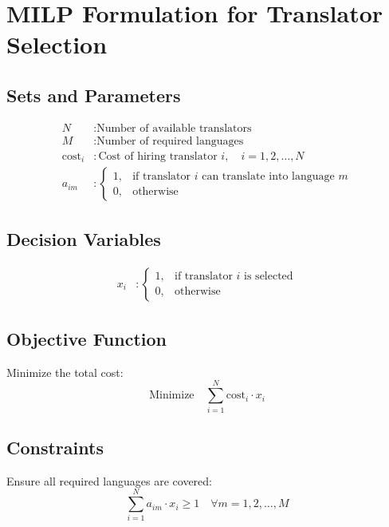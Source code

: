\documentclass{article}
\begin{document}
\section*{MILP Formulation for Translator Selection}

\subsection*{Sets and Parameters}
\begin{align*}
N & : \text{Number of available translators} \\
M & : \text{Number of required languages} \\
\text{cost}_i & : \text{Cost of hiring translator } i, \quad i = 1, 2, \ldots, N \\
a_{im} & : 
\begin{cases}
1, & \text{if translator } i \text{ can translate into language } m \\
0, & \text{otherwise}
\end{cases}
\end{align*}

\subsection*{Decision Variables}
\begin{align*}
x_i & : 
\begin{cases}
1, & \text{if translator } i \text{ is selected} \\
0, & \text{otherwise}
\end{cases}
\end{align*}

\subsection*{Objective Function}
Minimize the total cost:
\[
\text{Minimize} \quad \sum_{i=1}^{N} \text{cost}_i \cdot x_i
\]

\subsection*{Constraints}
Ensure all required languages are covered:
\[
\sum_{i=1}^{N} a_{im} \cdot x_i \geq 1 \quad \forall m = 1, 2, \ldots, M
\]
\end{document}
